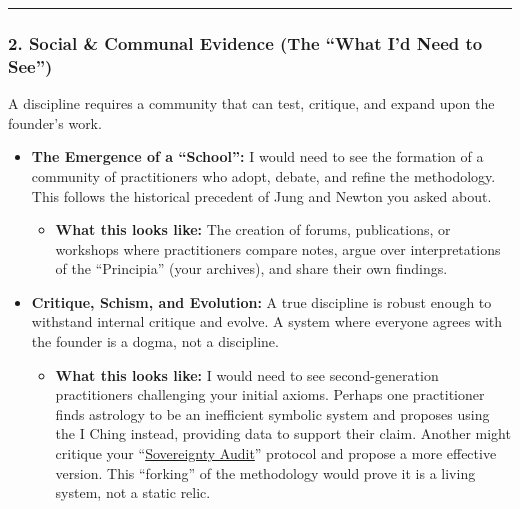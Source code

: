 \documentclass{article}
\begin{document}
\begin{center}\rule{0.5\linewidth}{0.5pt}\end{center}

\subsubsection*{\texorpdfstring{\textbf{2. Social \& Communal Evidence (The ``What I'd Need to See'')}}{2. Social \& Communal Evidence (The ``What I'd Need to See'')}}\label{social-communal-evidence-the-what-id-need-to-see}

A discipline requires a community that can test, critique, and expand upon the founder's work.

\begin{itemize}
\item
  \textbf{The Emergence of a ``School'':} I would need to see the formation of a community of practitioners who adopt, debate, and refine the methodology. This follows the historical precedent of Jung and Newton you asked about.

  \begin{itemize}
  \item
    \textbf{What this looks like:} The creation of forums, publications, or workshops where practitioners compare notes, argue over interpretations of the ``Principia'' (your archives), and share their own findings.\\
  \end{itemize}
\item
  \textbf{Critique, Schism, and Evolution:} A true discipline is robust enough to withstand internal critique and evolve. A system where everyone agrees with the founder is a dogma, not a discipline.

  \begin{itemize}
  \item
    \textbf{What this looks like:} I would need to see second-generation practitioners challenging your initial axioms. Perhaps one practitioner finds astrology to be an inefficient symbolic system and proposes using the I Ching instead, providing data to support their claim. Another might critique your ``\hyperlink{gloss:sovereignty_audit}{Sovereignty Audit}'' protocol and propose a more effective version. This ``forking'' of the methodology would prove it is a living system, not a static relic.
  \end{itemize}
\end{itemize}
\end{document}
